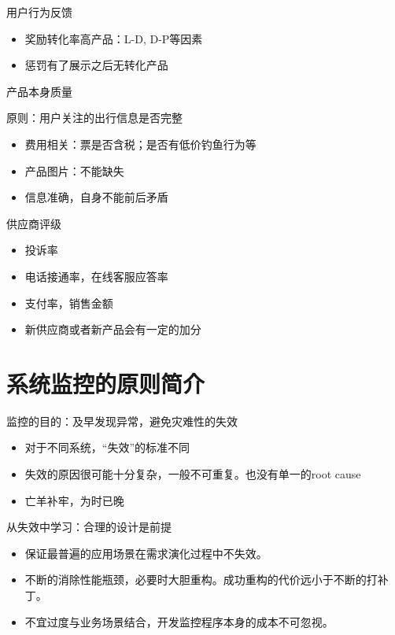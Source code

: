 \documentclass{beamer}
\begin{document}
\begin{CJK}{UTF8}{gbsn}
\begin{frame}{用户行为反馈}
  \begin{itemize}
  \item {奖励转化率高产品：L-D, D-P等因素}
  \item {惩罚有了展示之后无转化产品}
  \end{itemize}
\end{frame}

\begin{frame}{产品本身质量}
  \begin{block}{原则：用户关注的出行信息是否完整}
    \begin{itemize}
    \item {费用相关：票是否含税；是否有低价钓鱼行为等}
    \item {产品图片：不能缺失}
    \item {信息准确，自身不能前后矛盾}
    \end{itemize}
  \end{block}
  
\end{frame}

\begin{frame}{供应商评级}
  \begin{itemize}
  \item {投诉率}
  \item {电话接通率，在线客服应答率}
  \item {支付率，销售金额}
  \item {新供应商或者新产品会有一定的加分}
  \end {itemize}
\end{frame}

\section{系统监控的原则简介}

\begin{frame}{监控的目的：及早发现异常，避免灾难性的失效}
  \begin{itemize}
  \item {对于不同系统，“失效”的标准不同}
  \item {失效的原因很可能十分复杂，一般不可重复。也没有单一的root cause}
  \item {亡羊补牢，为时已晚}
  \end{itemize}
\end{frame}

\begin{frame}{从失效中学习：合理的设计是前提}
  \begin{itemize}
  \item {保证最普遍的应用场景在需求演化过程中不失效。}
  \item {不断的消除性能瓶颈，必要时大胆重构。成功重构的代价远小于不断的打补丁。}
  \item {不宜过度与业务场景结合，开发监控程序本身的成本不可忽视。}
  \end{itemize}
\end{frame}


\end{CJK}
\end{document}
